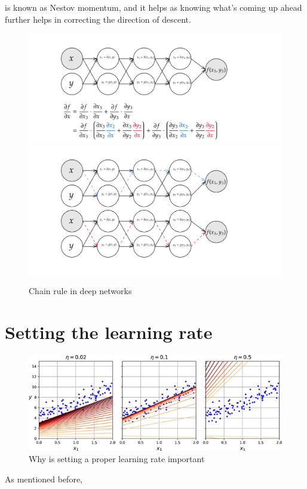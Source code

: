 is known as Nestov momentum, and it helps as knowing what's coming up ahead further helps
in correcting the direction of descent.
\begin{figure}
    \begin{center}
        \includegraphics[width=\textwidth]{graphics/revmodeautodiff.png}
        \includegraphics[width=\textwidth]{graphics/path comp.png}
    \end{center}
    \caption{Chain rule in deep networks}\label{path}
\end{figure}
\section{Setting the learning rate}
\begin{figure}
    \includegraphics[width=\textwidth]{graphics/learning rate.jpeg}
    \caption{Why is setting a proper learning rate important\citep{geron2022hands}}
\end{figure}
As mentioned before, 